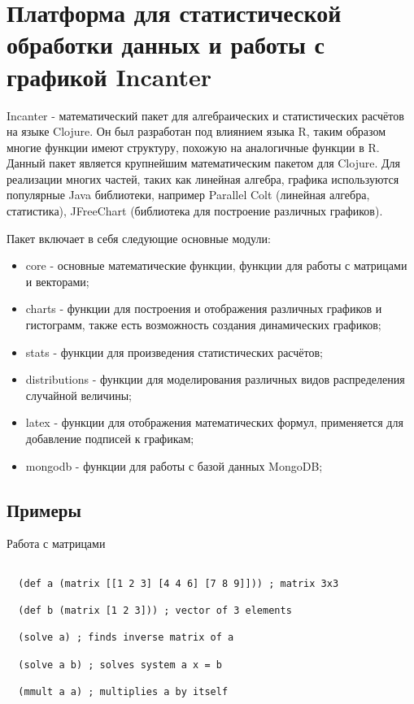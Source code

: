 \section{Платформа для статистической обработки данных и работы с графикой Incanter}

Incanter \cite{incanter}- математический пакет для алгебраических и статистических расчётов на языке Clojure. Он был разработан под влиянием языка R, таким образом многие функции имеют структуру, похожую на аналогичные функции в R. Данный пакет является крупнейшим математическим пакетом для Clojure. Для реализации многих частей, таких как линейная алгебра, графика используются популярные Java библиотеки, например Parallel Colt (линейная алгебра, статистика), JFreeChart (библиотека для построение различных графиков).

Пакет включает в себя следующие основные модули:

\begin{itemize}
\item core - основные математические функции, функции для работы с матрицами и векторами;

\item charts - функции для построения и отображения различных графиков и гистограмм, также есть возможность создания динамических графиков;

\item stats - функции для произведения статистических расчётов;

\item distributions - функции для моделирования различных видов распределения случайной величины;

\item latex - функции для отображения математических формул, применяется для добавление подписей к графикам;

\item mongodb - функции для работы с базой данных MongoDB;
\end{itemize}

\subsection{Примеры}

Работа с матрицами

\begin{verbatim}

  (def a (matrix [[1 2 3] [4 4 6] [7 8 9]])) ; matrix 3x3

  (def b (matrix [1 2 3])) ; vector of 3 elements

  (solve a) ; finds inverse matrix of a

  (solve a b) ; solves system a x = b

  (mmult a a) ; multiplies a by itself

\end{verbatim}


